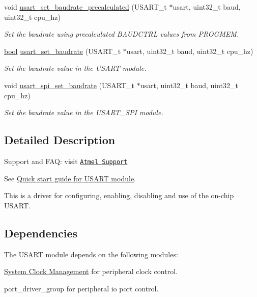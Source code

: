 \begin{DoxyCompactItemize}
void \hyperlink{group__usart__group_ga6c66b2efc3ec852e5226fa1105669e98}{usart\-\_\-set\-\_\-baudrate\-\_\-precalculated} (U\-S\-A\-R\-T\-\_\-t $\ast$usart, uint32\-\_\-t baud, uint32\-\_\-t cpu\-\_\-hz)
\begin{DoxyCompactList}\small\item\em Set the baudrate using precalculated B\-A\-U\-D\-C\-T\-R\-L values from P\-R\-O\-G\-M\-E\-M. \end{DoxyCompactList}\item 
\hyperlink{group__group__xmega__utils_ga97a80ca1602ebf2303258971a2c938e2}{bool} \hyperlink{group__usart__group_ga621fa6540397b3b81a9a5176c17e782a}{usart\-\_\-set\-\_\-baudrate} (U\-S\-A\-R\-T\-\_\-t $\ast$usart, uint32\-\_\-t baud, uint32\-\_\-t cpu\-\_\-hz)
\begin{DoxyCompactList}\small\item\em Set the baudrate value in the U\-S\-A\-R\-T module. \end{DoxyCompactList}\item 
void \hyperlink{group__usart__group_gae0deed785e24da0fa21c9bf4748f9edf}{usart\-\_\-spi\-\_\-set\-\_\-baudrate} (U\-S\-A\-R\-T\-\_\-t $\ast$usart, uint32\-\_\-t baud, uint32\-\_\-t cpu\-\_\-hz)
\begin{DoxyCompactList}\small\item\em Set the baudrate value in the U\-S\-A\-R\-T\-\_\-\-S\-P\-I module. \end{DoxyCompactList}\end{DoxyCompactItemize}


\subsection{Detailed Description}
Support and F\-A\-Q\-: visit \href{http://www.atmel.com/design-support/}{\tt Atmel Support}

See \hyperlink{xmega_usart_quickstart}{Quick start guide for U\-S\-A\-R\-T module}.

This is a driver for configuring, enabling, disabling and use of the on-\/chip U\-S\-A\-R\-T.\hypertarget{group__usart__group_dependencies}{}\subsection{Dependencies}\label{group__usart__group_dependencies}
The U\-S\-A\-R\-T module depends on the following modules\-:
\begin{DoxyItemize}
\item \hyperlink{group__sysclk__group}{System Clock Management} for peripheral clock control.
\item port\-\_\-driver\-\_\-group for peripheral io port control. 
\end{DoxyItemize}

